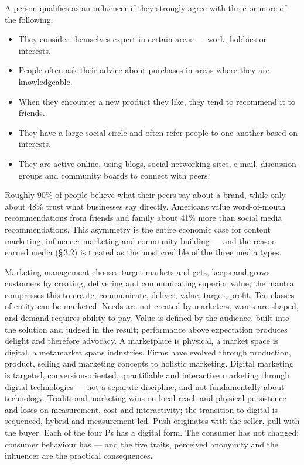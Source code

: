 \documentclass{MMTextbook}
\begin{document}
\begin{examplebox}
A person qualifies as an influencer if they strongly agree with three or more
of the following.
\begin{itemize}
\item They consider themselves expert in certain areas --- work, hobbies or
      interests.
\item People often ask their advice about purchases in areas where they are
      knowledgeable.
\item When they encounter a new product they like, they tend to recommend it to
      friends.
\item They have a large social circle and often refer people to one another
      based on interests.
\item They are active online, using blogs, social networking sites, e-mail,
      discussion groups and community boards to connect with peers.
\end{itemize}
\end{examplebox}

\begin{keybox}
Roughly 90\% of people believe what their peers say about a brand, while only
about 48\% trust what businesses say directly. Americans value word-of-mouth
recommendations from friends and family about 41\% more than social media
recommendations. This asymmetry is the entire economic case for content
marketing, influencer marketing and community building --- and the reason
earned media (\S\,3.2) is treated as the most credible of the three media
types.
\end{keybox}

\begin{summarybox}
Marketing management chooses target markets and gets, keeps and grows customers
by creating, delivering and communicating superior value; the mantra compresses
this to create, communicate, deliver, value, target, profit. Ten classes of
entity can be marketed. Needs are not created by marketers, wants are shaped,
and demand requires ability to pay. Value is defined by the audience, built
into the solution and judged in the result; performance above expectation
produces delight and therefore advocacy. A marketplace is physical, a market
space is digital, a metamarket spans industries. Firms have evolved through
production, product, selling and marketing concepts to holistic marketing.
Digital marketing is targeted, conversion-oriented, quantifiable and
interactive marketing through digital technologies --- not a separate
discipline, and not fundamentally about technology. Traditional marketing wins
on local reach and physical persistence and loses on measurement, cost and
interactivity; the transition to digital is sequenced, hybrid and
measurement-led. Push originates with the seller, pull with the buyer. Each of
the four Ps has a digital form. The consumer has not changed; consumer
behaviour has --- and the five traits, perceived anonymity and the influencer
are the practical consequences.
\end{summarybox}
\end{document}
